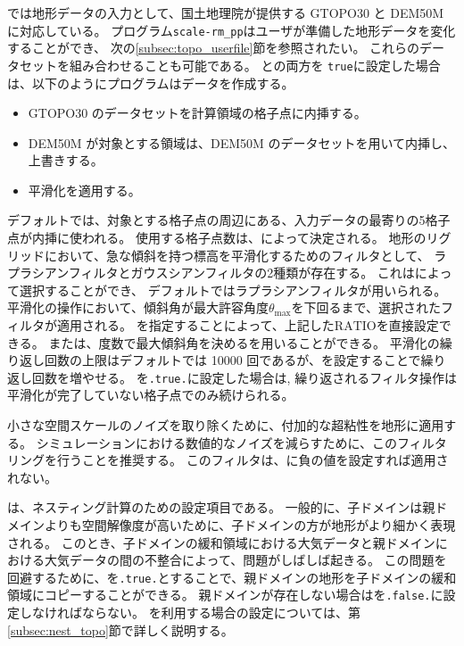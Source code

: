 \scalerm では地形データの入力として、国土地理院が提供する 
GTOPO30 と DEM50M に対応している。
プログラム\verb|scale-rm_pp|はユーザが準備した地形データを変化することができ、
次の\ref{subsec:topo_userfile}節を参照されたい。
これらのデータセットを組み合わせることも可能である。
との両方を
\verb|true|に設定した場合は、以下のようにプログラムはデータを作成する。

\begin{itemize}
 \item GTOPO30 のデータセットを計算領域の格子点に内挿する。
 \item DEM50M が対象とする領域は、DEM50M のデータセットを用いて内挿し、上書きする。
 \item 平滑化を適用する。
\end{itemize}

デフォルトでは、対象とする格子点の周辺にある、入力データの最寄りの5格子点が内挿に使われる。
使用する格子点数は、によって決定される。
地形のリグリッドにおいて、急な傾斜を持つ標高を平滑化するためのフィルタとして、
ラプラシアンフィルタとガウスシアンフィルタの2種類が存在する。
これはによって選択することができ、
デフォルトではラプラシアンフィルタが用いられる。
平滑化の操作において、傾斜角が最大許容角度$\theta_{\max}$を下回るまで、選択されたフィルタが適用される。
を指定することによって、上記した$\mathrm{RATIO}$を直接設定できる。
または、度数で最大傾斜角を決めるを用いることができる。
平滑化の繰り返し回数の上限はデフォルトでは 10000 回であるが、を設定することで繰り返し回数を増やせる。
を\verb|.true.|に設定した場合は, 繰り返されるフィルタ操作は平滑化が完了していない格子点でのみ続けられる。

小さな空間スケールのノイズを取り除くために、付加的な超粘性を地形に適用する。
シミュレーションにおける数値的なノイズを減らすために、このフィルタリングを行うことを推奨する。
このフィルタは、に負の値を設定すれば適用されない。

は、ネスティング計算のための設定項目である。
一般的に、子ドメインは親ドメインよりも空間解像度が高いために、子ドメインの方が地形がより細かく表現される。
このとき、子ドメインの緩和領域における大気データと親ドメインにおける大気データの間の不整合によって、問題がしばしば起きる。
この問題を回避するために、を\verb|.true.|とすることで、親ドメインの地形を子ドメインの緩和領域にコピーすることができる。
親ドメインが存在しない場合はを\verb|.false.|に設定しなければならない。
を利用する場合の設定については、第\ref{subsec:nest_topo}節で詳しく説明する。


